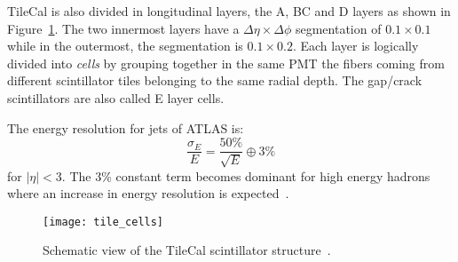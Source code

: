 TileCal is also divided in longitudinal layers, the A, BC and D layers as shown
in Figure~\ref{fig:tile_cells}. The two innermost layers have a
$\Delta \eta \times \Delta \phi$ segmentation of $0.1 \times 0.1$ while in the
outermost, the segmentation is $0.1 \times 0.2$. Each layer is logically divided
into \emph{cells} by grouping together in the same PMT the fibers coming from
different scintillator tiles belonging to the same radial depth. The gap/crack
scintillators are also called E layer cells.

The energy resolution for jets of ATLAS is:
\begin{equation}
  \label{eq:65}
  \frac{\sigma_E}{E} = \frac{50\%}{\sqrt{E}} \oplus 3\%
\end{equation}
for $|\eta| < 3$. The 3\% constant term becomes dominant for high energy hadrons
where an increase in energy resolution is expected~\cite{TileCal}.

\begin{figure}[!h]
  \centering
    \texttt{[image: tile\_cells]}
    \caption{Schematic view of the TileCal scintillator structure~\cite{TileCalPub}.}
    \label{fig:tile_cells}
\end{figure}
